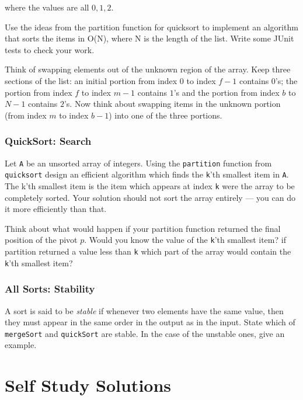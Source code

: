 \documentclass[twoside=false,DIV=14]{scrartcl}
\begin{document}
where the values are all $0, 1, 2$.

Use the ideas from the 
partition function for quicksort to implement an algorithm that sorts the items in O(N), where N
is the length of the list. 
Write some JUnit tests to check your work.

\begin{hint}
Think of swapping elements out of the unknown region of the array.  Keep three sections of the list: an initial portion from index $0$ to index $f-1$ contains $0$'s; the portion from index $f$ to index $m-1$ contains $1$'s and the portion from index $b$ to $N-1$ contains $2$'s. Now think about swapping items in the unknown portion (from index $m$ to index $b-1$) into one of the three portions.
\end{hint}

\section{QuickSort: Search}
Let {\tt A} be an unsorted array of integers. Using the {\tt partition} function from {\tt quicksort} design an efficient algorithm which finds the {\tt  k}'th smallest item in {\tt A}. The k'th smallest item is the item which appears at index {\tt k} were the array to be completely sorted. Your solution should not sort the array entirely --- you can do it more efficiently than that.
    
\begin{hint}
Think about what would happen if your partition function returned the final position of the pivot $p$. Would you know the value of the {\tt k}'th smallest item?  if partition returned a value less than {\tt k} which part of the array would contain the {\tt k}'th smallest item?
\end{hint}
    
\section{All Sorts: Stability} 
A sort is said to be \emph{stable} if whenever two elements have the same value, then they must appear in the same order in the output as in the input. State which of {\tt mergeSort} and {\tt quickSort} are stable. In the case of the unstable ones, give an example.
    
\newpage\setcounter{section}{0}
\part*{Self Study Solutions}
\end{document}
